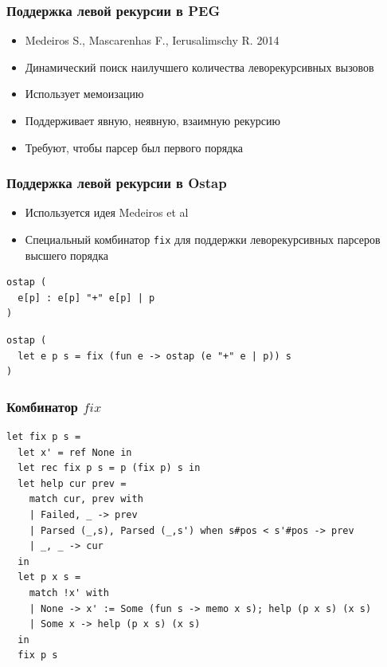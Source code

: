 \documentclass{beamer}
\begin{document}


\begin{frame}
  \transwipe[direction=90]
  \frametitle{Поддержка левой рекурсии в PEG}
  \begin{itemize}
    \item Medeiros S., Mascarenhas F., Ierusalimschy R. 2014 %
    \item Динамический поиск наилучшего количества леворекурсивных вызовов
    \item Использует мемоизацию
    \item Поддерживает явную, неявную, взаимную рекурсию
    \item Требуют, чтобы парсер был первого порядка
  \end{itemize}
\end{frame}

\begin{frame}[fragile]
  \transwipe[direction=90]
  \frametitle{Поддержка левой рекурсии в Ostap}
  \begin{itemize} 
    \item Используется идея Medeiros et al
    \item Специальный комбинатор \verb!fix! для поддержки леворекурсивных парсеров высшего порядка
  \end{itemize}
\begin{lstlisting}[frame=single]  
ostap (
  e[p] : e[p] "+" e[p] | p
)
\end{lstlisting}

\begin{lstlisting}[frame=single]  
ostap (
  let e p s = fix (fun e -> ostap (e "+" e | p)) s
)
\end{lstlisting}
\end{frame}


\begin{frame}[fragile]
  \transwipe[direction=90]
  \frametitle{Комбинатор $fix$}

\begin{lstlisting}[frame=single]  
let fix p s = 
  let x' = ref None in  
  let rec fix p s = p (fix p) s in
  let help cur prev =
    match cur, prev with 
    | Failed, _ -> prev
    | Parsed (_,s), Parsed (_,s') when s#pos < s'#pos -> prev
    | _, _ -> cur
  in
  let p x s = 
    match !x' with
    | None -> x' := Some (fun s -> memo x s); help (p x s) (x s)
    | Some x -> help (p x s) (x s)
  in
  fix p s
\end{lstlisting}
\end{frame}
\end{document}

